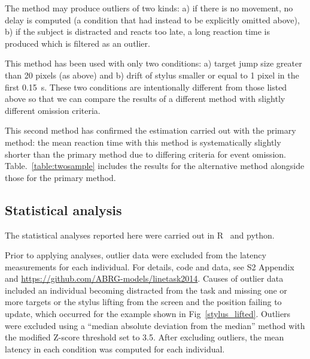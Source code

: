 \documentclass[10pt,letterpaper]{article}
\newcommand{\filename}[1]{\textsf{\textbf{#1}}}
\begin{document}
The method may produce outliers of two kinds: a) if there is no
movement, no delay is computed (a condition that had instead to be
explicitly omitted above), b) if the subject is distracted and reacts
too late, a long reaction time is produced which is filtered as an
outlier.

This method has been used with only two conditions: a) target
jump size greater than 20 pixels (as above) and b) drift of stylus
smaller or equal to 1 pixel in the first 0.15~s. These two conditions
are intentionally different from those listed above so that we can
compare the results of a different method with slightly different
omission criteria.

This second method has confirmed the estimation carried out with the
primary method: the mean reaction time with this method is
systematically slightly shorter than the primary method due to
differing criteria for event omission. Table.~\ref{table:twosample}
includes the results for the alternative method alongside those for
the primary method.

\subsection*{Statistical analysis}

%
The statistical analyses reported here were carried out in
R~\cite{r_core_team_r:_2013} and python.

Prior to applying analyses, outlier data were excluded from the
latency measurements for each individual. For details, code and data,
see S2 Appendix and \url{https://github.com/ABRG-models/linetask2014}.
Causes of outlier data included an individual becoming distracted from
the task and missing one or more targets or the stylus lifting from
the screen and the position failing to update, which occurred for the
example shown in Fig~\ref{stylus_lifted}. Outliers were excluded
using a ``median absolute deviation from the median'' method
\cite{boris_iglewicz_how_1993} with the modified Z-score threshold set
to 3.5. After excluding outliers, the mean latency in each condition
was computed for each individual.
\end{document}

